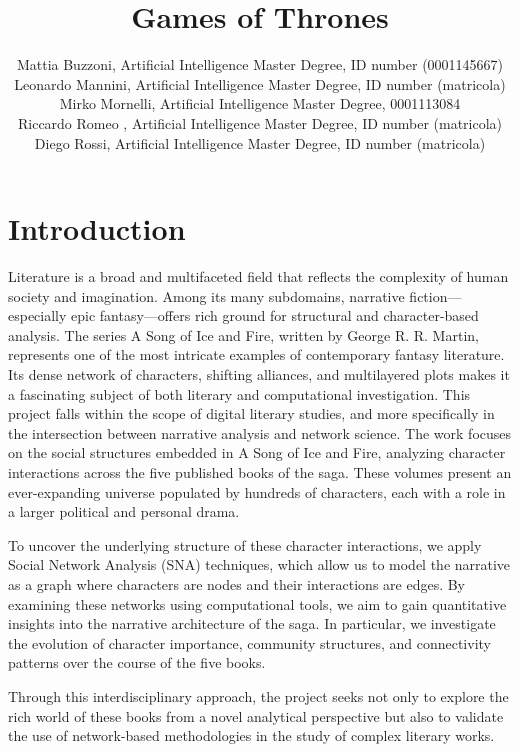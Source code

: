 \documentclass[12pt, a4paper]{article}
\author{Mattia Buzzoni, Artificial Intelligence Master Degree, ID number (0001145667)
\\Leonardo Mannini, Artificial Intelligence Master Degree, ID number (matricola)
\\ Mirko Mornelli, Artificial Intelligence Master Degree, 0001113084
\\Riccardo Romeo , Artificial Intelligence Master Degree, ID number (matricola)
\\Diego Rossi, Artificial Intelligence Master Degree, ID number (matricola)}
\date{}
\title{Games of Thrones}
\begin{document}
\maketitle

\section{Introduction}
\label{introduction}
\begin{comment}
(The history of the 5 books)
The context includes: the general field (e.g., literature, history,
archaeology, tourism, biology, forensics, religious studies); the
specific application (e.g., literary analysis, quantitative history,
genetics, virology, forensics intelligence, tourism planning, biblical
quantitative studies).
\end{comment}
Literature is a broad and multifaceted field that reflects the complexity of human society and imagination. Among its many subdomains, narrative fiction—especially epic fantasy—offers rich ground for structural and character-based analysis. The series A Song of Ice and Fire, written by George R. R. Martin, represents one of the most intricate examples of contemporary fantasy literature. Its dense network of characters, shifting alliances, and multilayered plots makes it a fascinating subject of both literary and computational investigation. 
This project falls within the scope of digital literary studies, and more specifically in the intersection between narrative analysis and network science. The work focuses on the social structures embedded in A Song of Ice and Fire, analyzing character interactions across the five published books of the saga. These volumes present an ever-expanding universe populated by hundreds of characters, each with a role in a larger political and personal drama.

To uncover the underlying structure of these character interactions, we apply Social Network Analysis (SNA) techniques, which allow us to model the narrative as a graph where characters are nodes and their interactions are edges. By examining these networks using computational tools, we aim to gain quantitative insights into the narrative architecture of the saga. In particular, we investigate the evolution of character importance, community structures, and connectivity patterns over the course of the five books.

Through this interdisciplinary approach, the project seeks not only to explore the rich world of these books from a novel analytical perspective but also to validate the use of network-based methodologies in the study of complex literary works.
\end{document}
